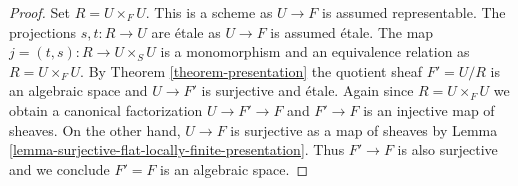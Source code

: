\documentclass[10pt,a4paper]{amsart}
\theoremstyle{plain}
\theoremstyle{definition}
\theoremstyle{remark}
\numberwithin{equation}{subsection}
\begin{document}
\begin{proof}
Set $R = U \times_F U$. This is a scheme as $U \to F$ is assumed representable.
The projections $s, t : R \to U$ are \'etale as $U \to F$ is assumed \'etale.
The map $j = (t, s) : R \to U \times_S U$ is a monomorphism and an equivalence
relation as $R = U \times_F U$. By Theorem \ref{theorem-presentation}
the quotient sheaf $F' = U/R$ is an algebraic space and $U \to F'$
is surjective and \'etale. Again since $R = U \times_F U$ we obtain
a canonical factorization $U \to F' \to F$ and $F' \to F$ is an injective
map of sheaves. On the other hand, $U \to F$ is surjective as a map
of sheaves by Lemma \ref{lemma-surjective-flat-locally-finite-presentation}.
Thus $F' \to F$ is also surjective and we conclude $F' = F$ is an
algebraic space.
\end{proof}
\end{document}
